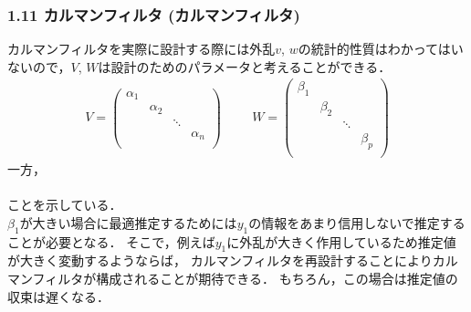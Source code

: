 \begin{frame}[t]
\frametitle{1.11 カルマンフィルタ (カルマンフィルタ)}
\addtocounter{equation}{-1}
カルマンフィルタを実際に設計する際には外乱$v$, $w$の統計的性質はわかってはいないので，$V$, $W$は設計のためのパラメータと考えることができる．
\begin{align}
  V =    \left(
      \begin{array}{cccc}
        \alpha_1 & & & \\
        & \alpha_2 & & \\
        & & \ddots & \\
        & & & \alpha_n \\
      \end{array}
    \right)
\hspace{1cm}
  W =    \left(
      \begin{array}{cccc}
        \beta_1 & & & \\
        & \beta_2 & & \\
        & & \ddots & \\
        & & & \beta_p \\
      \end{array}
    \right)
\end{align}
一方，\\
 \\ことを示している．\\
$\beta_1$が大きい場合に最適推定するためには$y_1$の情報をあまり信用しないで推定することが必要となる．
そこで，例えば$y_1$に外乱が大きく作用しているため推定値が大きく変動するようならば，
カルマンフィルタを再設計することによりカルマンフィルタが構成されることが期待できる．
もちろん，この場合は推定値の収束は遅くなる．

\end{frame}


